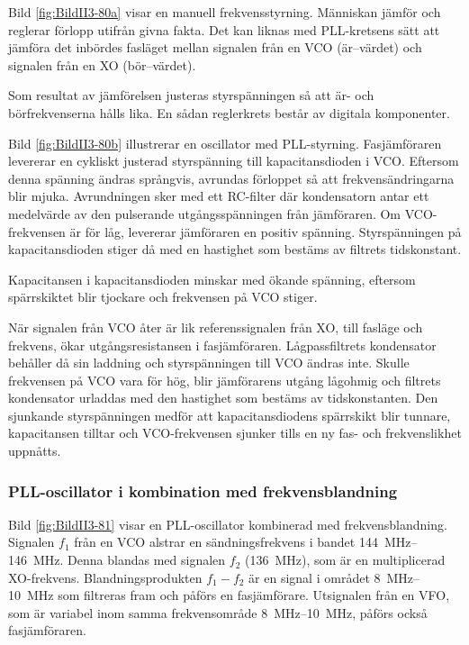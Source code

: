 Bild \ref{fig:BildII3-80a} visar en manuell frekvensstyrning.
Människan jämför och reglerar förlopp utifrån givna fakta.
Det kan liknas med PLL-kretsens sätt att jämföra det inbördes fasläget mellan
signalen från en VCO (är--värdet) och signalen från en XO (bör--värdet).

Som resultat av jämförelsen justeras styrspänningen så att är- och
börfrekvenserna hålls lika.
En sådan reglerkrets består av digitala komponenter.


Bild \ref{fig:BildII3-80b} illustrerar en oscillator med PLL-styrning.
Fasjämföraren levererar en cykliskt justerad styrspänning till
kapacitansdioden i VCO.
Eftersom denna spänning ändras språngvis, avrundas förloppet så att 
frekvensändringarna blir mjuka.
Avrundningen sker med ett RC-filter där kondensatorn antar ett medelvärde av 
den pulserande utgångsspänningen från jämföraren.
Om VCO-frekvensen är för låg, levererar jämföraren en positiv spänning.
Styrspänningen på kapacitansdioden stiger då med en hastighet som bestäms av
filtrets tidskonstant.

Kapacitansen i kapacitansdioden minskar med ökande spänning, eftersom
spärrskiktet blir tjockare och frekvensen på VCO stiger.

När signalen från VCO åter är lik referenssignalen från XO, till
fasläge och frekvens, ökar utgångsresistansen i fasjämföraren.
Lågpassfiltrets kondensator behåller då sin laddning och styrspänningen till 
VCO ändras inte.
Skulle frekvensen på VCO vara för hög, blir jämförarens utgång lågohmig och
filtrets kondensator urladdas med den hastighet som bestäms av tidskonstanten.
Den sjunkande styrspänningen medför att kapacitansdiodens spärrskikt blir
tunnare, kapacitansen tilltar och VCO-frekvensen sjunker tills en ny fas- och
frekvenslikhet uppnåtts.

\subsubsection{PLL-oscillator i kombination med frekvensblandning}


Bild \ref{fig:BildII3-81} visar en PLL-oscillator kombinerad med
frekvensblandning.
Signalen \(f_1\) från en VCO alstrar en sändningsfrekvens i bandet
\SIrange{144}{146}{\mega\hertz}.
Denna blandas med signalen \(f_2\) (\SI{136}{\mega\hertz}), som är en
multiplicerad XO-frekvens.
Blandningsprodukten \(f_1 - f_2\) är en signal i området
\SIrange{8}{10}{\mega\hertz} som filtreras fram och påförs en fasjämförare.
Utsignalen från en VFO, som är variabel inom samma frekvensområde
\SIrange{8}{10}{\mega\hertz}, påförs också fasjämföraren.

